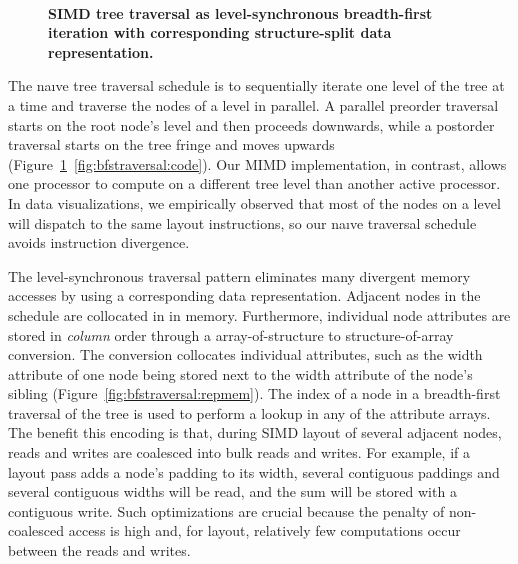 \begin{figure}
 \\
\caption{\textbf{SIMD tree traversal as level-synchronous breadth-first iteration with corresponding structure-split data representation.}}
\label{fig:bfstraversal}
\end{figure}

The na\i{v}e tree traversal schedule is to sequentially iterate one level of the tree at a time and  traverse the nodes of a level in parallel. A parallel preorder traversal starts on the root node's level and then proceeds downwards, while a postorder traversal starts on the tree fringe and moves upwards (Figure~\ref{fig:bfstraversal}~\ref{fig:bfstraversal:code}). Our MIMD implementation, in contrast, allows one processor to compute on a different tree level than another active processor. In data visualizations, we empirically observed that most of the nodes on a level will dispatch to the same layout instructions, so our na\i{v}e traversal schedule avoids instruction divergence.

The level-synchronous traversal pattern eliminates many divergent memory accesses by using a corresponding data representation. Adjacent nodes in the schedule are collocated in in memory. Furthermore, individual node attributes are stored in \emph{column} order through a array-of-structure to structure-of-array conversion. The conversion collocates individual attributes, such as the width attribute of one node being stored next to the width attribute of the node's sibling (Figure~\ref{fig:bfstraversal:repmem}). The index of a node in a breadth-first traversal of the tree is used to perform a lookup in any of the attribute arrays. The benefit this encoding is that, during SIMD  layout of several adjacent nodes, reads and writes are coalesced into  bulk reads and writes. For example, if a layout pass adds a node's padding to its width, several contiguous paddings and several contiguous widths will be read, and the sum will be stored with a contiguous write. Such optimizations are crucial because the penalty of non-coalesced access is high and, for layout, relatively few computations occur between the reads and writes.


